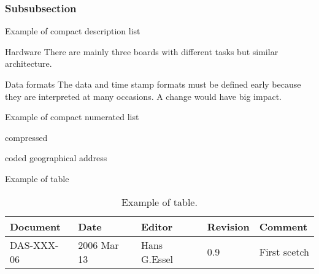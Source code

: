 \subsubsection{Subsubsection}

Example of compact description list
\begin{compactdesc}
\item[Hardware] There are mainly three boards with different tasks but similar architecture.
\item[Data formats] The data and time stamp formats must be defined early because they are
interpreted at many occasions. A change would have big impact.
\end{compactdesc}

Example of compact numerated list
\begin{compactenum}
\item compressed
\item coded geographical address
\end{compactenum}

Example of table
\begin{table}[h]
\begin{tabular}{|p{2.0cm}|p{2.0cm}|p{3.0cm}|p{1.6cm}|p{5.0cm}|}      \hline
Document   & Date        & Editor       & Revision & Comment      \\ \hline
DAS-XXX-06 & 2006 Mar 13 & Hans G.Essel & 0.9      & First scetch \\ \hline
\end{tabular}
\caption{Example of table.}
\label{XXX-table}
\end{table}
